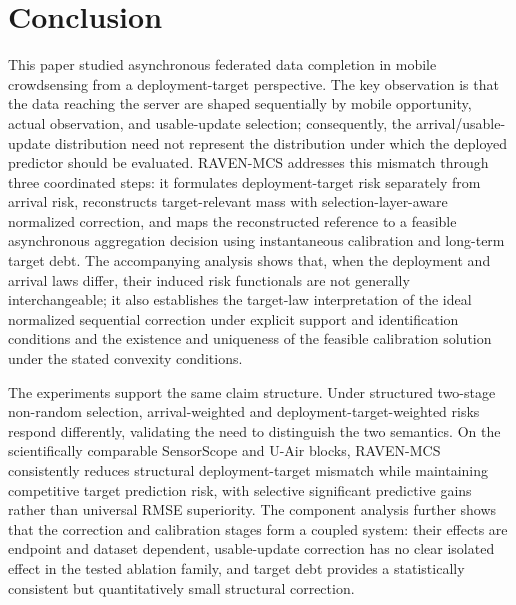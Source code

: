 \documentclass[letterpaper,journal]{IEEEtran}
\begin{document}

\section{Conclusion}
\label{sec:conclusion}

This paper studied asynchronous federated data completion in mobile
crowdsensing from a deployment-target perspective.  The key observation is that
the data reaching the server are shaped sequentially by mobile opportunity,
actual observation, and usable-update selection; consequently, the
arrival/usable-update distribution need not represent the distribution under
which the deployed predictor should be evaluated.  RAVEN-MCS addresses this
mismatch through three coordinated steps: it formulates deployment-target risk
separately from arrival risk, reconstructs target-relevant mass with
selection-layer-aware normalized correction, and maps the reconstructed
reference to a feasible asynchronous aggregation decision using instantaneous
calibration and long-term target debt.  The accompanying analysis shows that, when the deployment and arrival laws
differ, their induced risk functionals are not generally interchangeable; it
also establishes the target-law interpretation of the ideal normalized
sequential correction under explicit support and identification conditions and
the existence and uniqueness of the feasible calibration solution under the
stated convexity conditions.

The experiments support the same claim structure.  Under structured
two-stage non-random selection, arrival-weighted and deployment-target-weighted
risks respond differently, validating the need to distinguish the two
semantics.  On the scientifically comparable SensorScope and U-Air blocks,
RAVEN-MCS consistently reduces structural deployment-target mismatch while
maintaining competitive target prediction risk, with selective significant
predictive gains rather than universal RMSE superiority.  The component
analysis further shows that the correction and calibration stages form a
coupled system: their effects are endpoint and dataset dependent, usable-update
correction has no clear isolated effect in the tested ablation family, and
target debt provides a statistically consistent but quantitatively small
structural correction.
\end{document}
